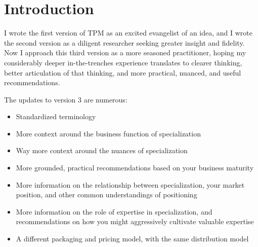 \chapter{Introduction}

I wrote the first version of TPM as an excited evangelist of an idea, and I wrote the second version as a diligent researcher seeking greater insight and fidelity. Now I approach this third version as a more seasoned practitioner, hoping my considerably deeper in-the-trenches experience translates to clearer thinking, better articulation of that thinking, and more practical, nuanced, and useful recommendations.

The updates to version 3 are numerous:

\begin{itemize}
\item Standardized terminology
\item More context around the business function of specialization
\item Way more context around the nuances of specialization
\item More grounded, practical recommendations based on your business maturity
\item More information on the relationship between specialization, your market position, and other common understandings of positioning
\item More information on the role of expertise in specialization, and recommendations on how you might aggressively cultivate valuable expertise
\item A different packaging and pricing model, with the same distribution model



\end{itemize}
